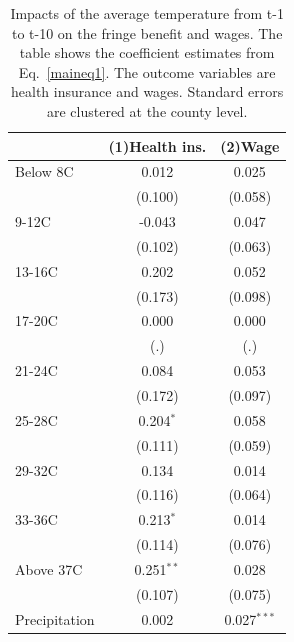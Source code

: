 \documentclass[12pt]{article}
\newcommand{\sym}[1]{\ensuremath{^{#1}}}
\begin{document}
\begin{table}[h!]
\caption{Impacts of the average temperature from t-1 to t-10 on the fringe benefit and wages. The table shows the coefficient estimates from Eq.~\ref{maineq1}. The outcome variables are health insurance and wages. Standard errors are clustered at the county level.}
\label{mainresult}
\centering
\footnotesize
\begin{tabular}{l*{2}{c}}
\hline\hline
                    &\multicolumn{1}{c}{(1)Health ins.}&\multicolumn{1}{c}{(2)Wage}\\
\hline
Below 8C            &       0.012         &       0.025         \\
                    &     (0.100)         &     (0.058)         \\
9-12C               &      -0.043         &       0.047         \\
                    &     (0.102)         &     (0.063)         \\
13-16C              &       0.202         &       0.052         \\
                    &     (0.173)         &     (0.098)         \\
17-20C              &       0.000         &       0.000         \\
                    &         (.)         &         (.)         \\
21-24C              &       0.084         &       0.053         \\
                    &     (0.172)         &     (0.097)         \\
25-28C              &       0.204\sym{*}  &       0.058         \\
                    &     (0.111)         &     (0.059)         \\
29-32C              &       0.134         &       0.014         \\
                    &     (0.116)         &     (0.064)         \\
33-36C              &       0.213\sym{*}  &       0.014         \\
                    &     (0.114)         &     (0.076)         \\
Above 37C           &       0.251\sym{**} &       0.028         \\
                    &     (0.107)         &     (0.075)         \\
Precipitation       &       0.002         &       0.027\sym{***}\\

\end{tabular}
\end{table}
\end{document}
